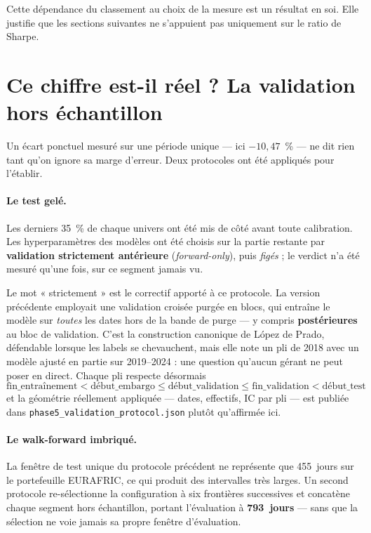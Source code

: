 Cette dépendance du classement au choix de la mesure est un résultat en soi. Elle
justifie que les sections suivantes ne s'appuient pas uniquement sur le ratio de
Sharpe.

\section{Ce chiffre est-il réel ? La validation hors échantillon}

Un écart ponctuel mesuré sur une période unique — ici $-10{,}47$~\% — ne dit
rien tant qu'on ignore sa marge d'erreur. Deux protocoles ont été appliqués pour
l'établir.

\paragraph{Le test gelé.} Les derniers 35~\% de chaque univers ont été mis de
côté avant toute calibration. Les hyperparamètres des modèles ont été choisis sur
la partie restante par \textbf{validation strictement antérieure}
(\emph{forward-only}), puis \emph{figés} ; le verdict n'a été mesuré qu'une fois,
sur ce segment jamais vu.

Le mot « strictement » est le correctif apporté à ce protocole. La version
précédente employait une validation croisée purgée en blocs, qui entraîne le
modèle sur \emph{toutes} les dates hors de la bande de purge — y compris
\textbf{postérieures} au bloc de validation. C'est la construction canonique de
López de Prado, défendable lorsque les labels se chevauchent, mais elle note un
pli de 2018 avec un modèle ajusté en partie sur 2019--2024 : une question
qu'aucun gérant ne peut poser en direct. Chaque pli respecte désormais
\[
\text{fin\_entraînement} < \text{début\_embargo} \le \text{début\_validation}
\le \text{fin\_validation} < \text{début\_test}
\]
et la géométrie réellement appliquée — dates, effectifs, IC par pli — est publiée
dans \texttt{phase5\_\allowbreak validation\_\allowbreak protocol.json} plutôt qu'affirmée ici.

\paragraph{Le walk-forward imbriqué.} La fenêtre de test unique du protocole
précédent ne représente que 455~jours sur le portefeuille EURAFRIC, ce qui produit
des intervalles très larges. Un second protocole re-sélectionne la configuration à
six frontières successives et concatène chaque segment hors échantillon, portant
l'évaluation à \textbf{793~jours} — sans que la sélection ne voie jamais sa propre
fenêtre d'évaluation.

